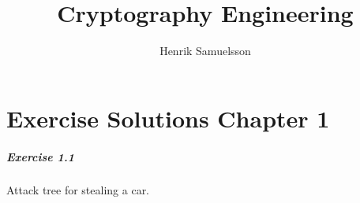 \documentclass[]{article}
\title{Cryptography Engineering}
\author{Henrik Samuelsson}
\begin{document}
	\graphicspath{{./resources/}}
	\maketitle
	
	\section{Exercise Solutions Chapter 1}
	\subparagraph{Exercise 1.1}
	Attack tree for stealing a car.
	
	
	
		
	
	
\end{document}
